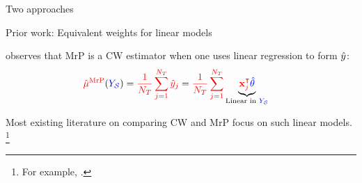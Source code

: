 \begin{frame}[t]{Two approaches}
\end{frame}



\begin{frame}{Prior work: Equivalent weights for linear models}

\textcite{gelman:2007:struggles} observes that MrP is a CW estimator when
one uses linear regression to form $\hat{y}$:
$$
\begin{aligned}
\textcolor{red}{\hat{\mu}^{\mathrm{MrP}}}(\textcolor{blue}{\textcolor{blue}{Y_{\mathcal{S}}}}) ={}& \textcolor{red}{\frac{1}{{N_T}} \sum_{j=1}^{N_T} \hat{y}_j} =
\textcolor{red}{\frac{1}{{N_T}} \sum_{j=1}^{N_T} }
\underbrace{\textcolor{red}{\mathbf{x}_j^\intercal} \textcolor{blue}{\hat{\theta}}}_{\textrm{Linear in }\textcolor{blue}{\textcolor{blue}{Y_{\mathcal{S}}}}}
\end{aligned}
$$

Most existing literature on comparing CW and MrP focus on such linear models.
\footnote{
    For example,
    \textcite{gelman:2007:struggles,benmichael:2021:multilevel,chattopadhyay:2023:implied}.}

\vspace{1em}

\end{frame}






